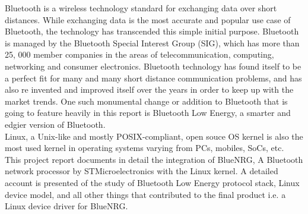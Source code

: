 \begin{Large}
\end{Large}

\vskip 0.1in
\noindent Bluetooth is a wireless technology standard for exchanging data over short distances. While exchanging data is the most accurate and popular use case of Bluetooth, the technology has transcended this simple initial purpose. Bluetooth is managed by the Bluetooth Special Interest Group (SIG), which has more than 25, 000 member companies in the areas of telecommunication, computing, networking and consumer electronics. Bluetooth technology has found itself to be a perfect fit for many and many short distance communication problems, and has also re invented and improved itself over the years in order to keep up with the market trends. One such monumental change or addition to Bluetooth that is going to feature heavily in this report is Bluetooth Low Energy, a smarter and edgier version of Bluetooth.\\

\noindent Linux, a Unix-like and mostly POSIX-compliant, open souce OS kernel is also the most used kernel in operating systems varying from PCs, mobiles, SoCs, etc.\\

\noindent This project report documents in detail the integration of BlueNRG, A Bluetooth network processor by STMicroelectronics with the Linux kernel. A detailed account is presented of the study of Bluetooth Low Energy protocol stack, Linux device model, and all other things that contributed to the final product i.e. a Linux device driver for BlueNRG.
